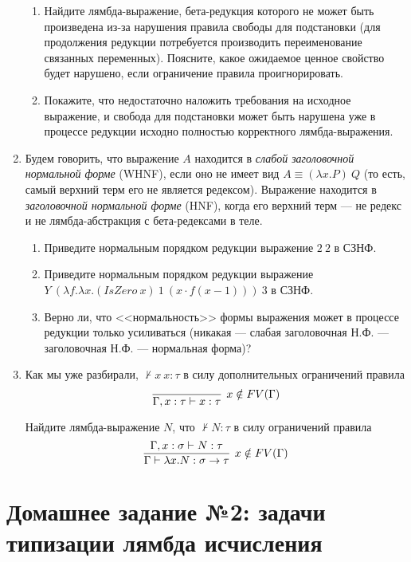 \documentclass[10pt,a4paper,oneside]{article}
\begin{document}
\begin{enumerate}
\begin{enumerate}
\item Найдите лямбда-выражение, бета-редукция которого не может быть произведена из-за нарушения
правила свободы для подстановки (для продолжения редукции потребуется производить переименование
связанных переменных). Поясните, какое ожидаемое ценное свойство будет нарушено, если ограничение
правила проигнорировать.
\item Покажите, что недостаточно наложить требования на исходное выражение, и свобода для подстановки
может быть нарушена уже в процессе редукции исходно полностью корректного лямбда-выражения.
\end{enumerate}

\item Будем говорить, что выражение $A$ находится в \emph{слабой заголовочной нормальной форме} (WHNF),
если оно не имеет вид $A \equiv (\lambda x.P)\ Q$ (то есть, самый верхний терм его не является редексом).
Выражение находится в \emph{заголовочной нормальной форме} (HNF), когда его верхний терм --- не редекс и не лямбда-абстракция
с бета-редексами в теле.
\begin{enumerate}
\item Приведите нормальным порядком редукции выражение $2\ 2$ в СЗНФ.
\item Приведите нормальным порядком редукции выражение $Y\ (\lambda f.\lambda x.(IsZero\ x)\ 1\ (x \cdot f(x-1)))\ 3$ в СЗНФ.
\item Верно ли, что <<нормальность>> формы выражения может в процессе редукции только усиливаться
(никакая --- слабая заголовочная Н.Ф. --- заголовочная Н.Ф. --- нормальная форма)?
\end{enumerate}

\item Как мы уже разбирали, $\not\vdash x\ x:\tau$ в силу дополнительных ограничений
правила
$$\infer[x \notin FV(\Gamma)]{\Gamma, x:\tau\vdash x:\tau}{}$$

Найдите лямбда-выражение $N$, что $\not\vdash N:\tau$ в силу ограничений правила
$$\infer[x \notin FV(\Gamma)]{\Gamma \vdash \lambda x.N:\sigma\to\tau}{\Gamma, x:\sigma \vdash N:\tau}$$


\end{enumerate}

\section*{Домашнее задание №2: задачи типизации лямбда исчисления}
\end{document}
